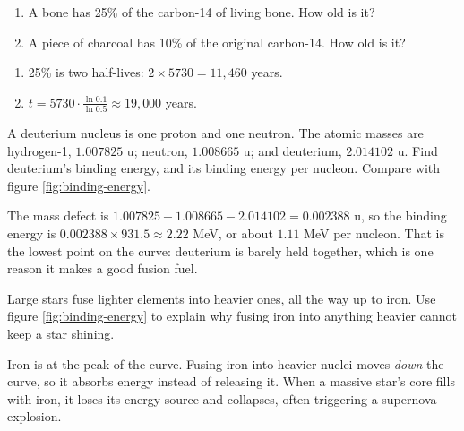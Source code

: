 \begin{Exercise}[title={How Old Is It?}, label=np_dating]
\begin{enumerate}
\item A bone has 25\% of the carbon-14 of living bone. How old is it?
\item A piece of charcoal has 10\% of the original carbon-14. How old is it?
\end{enumerate}
\end{Exercise}
\begin{Answer}[ref=np_dating]
\begin{enumerate}
\item 25\% is two half-lives: $2 \times 5730 = 11{,}460$ years.
\item $t = 5730 \cdot \frac{\ln 0.1}{\ln 0.5} \approx 19{,}000$ years.
\end{enumerate}
\end{Answer}

\begin{Exercise}[title={Deuterium's Binding Energy}, label=np_deuterium]
A deuterium nucleus is one proton and one neutron. The atomic masses are hydrogen-1, $1.007825$ u;
neutron, $1.008665$ u; and deuterium, $2.014102$ u. Find deuterium's binding energy, and its binding energy
per nucleon. Compare with figure \ref{fig:binding-energy}.
\end{Exercise}
\begin{Answer}[ref=np_deuterium]
The mass defect is $1.007825 + 1.008665 - 2.014102 = 0.002388$ u, so the binding energy is
$0.002388 \times 931.5 \approx 2.22$ MeV, or about $1.11$ MeV per nucleon. That is the lowest point on the curve:
deuterium is barely held together, which is one reason it makes a good fusion fuel.
\end{Answer}

\begin{Exercise}[title={The End of a Star}, label=np_iron]
Large stars fuse lighter elements into heavier ones, all the way up to iron. Use figure
\ref{fig:binding-energy} to explain why fusing iron into anything heavier cannot keep a star shining.
\end{Exercise}
\begin{Answer}[ref=np_iron]
Iron is at the peak of the curve. Fusing iron into heavier nuclei moves \emph{down} the curve, so it
absorbs energy instead of releasing it. When a massive star's core fills with iron, it loses its energy
source and collapses, often triggering a supernova explosion.
\end{Answer}
